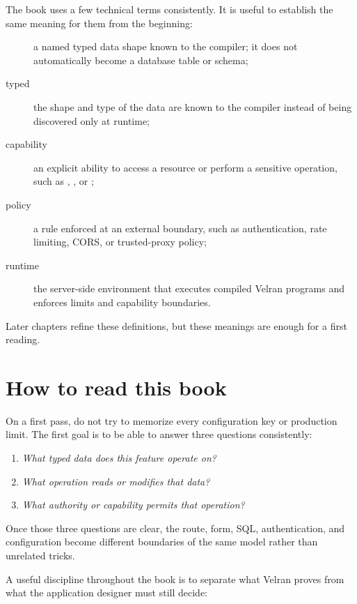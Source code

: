 The book uses a few technical terms consistently. It is useful to establish the same meaning for them from the beginning:

\begin{description}
  \item[] a named typed data shape known to the compiler; it does not automatically become a database table or schema;
  \item[typed] the shape and type of the data are known to the compiler instead of being discovered only at runtime;
  \item[capability] an explicit ability to access a resource or perform a sensitive operation, such as , , or ;
  \item[policy] a rule enforced at an external boundary, such as authentication, rate limiting, CORS, or trusted-proxy policy;
  \item[runtime] the server-side environment that executes compiled Velran programs and enforces limits and capability boundaries.
\end{description}

Later chapters refine these definitions, but these meanings are enough for a first reading.


\section*{How to read this book}

On a first pass, do not try to memorize every configuration key or production limit. The first goal is to be able to answer three questions consistently:

\begin{enumerate}
  \item \emph{What typed data does this feature operate on?}
  \item \emph{What operation reads or modifies that data?}
  \item \emph{What authority or capability permits that operation?}
\end{enumerate}

Once those three questions are clear, the route, form, SQL, authentication, and configuration become different boundaries of the same model rather than unrelated tricks.

A useful discipline throughout the book is to separate what Velran proves from what the application designer must still decide:

